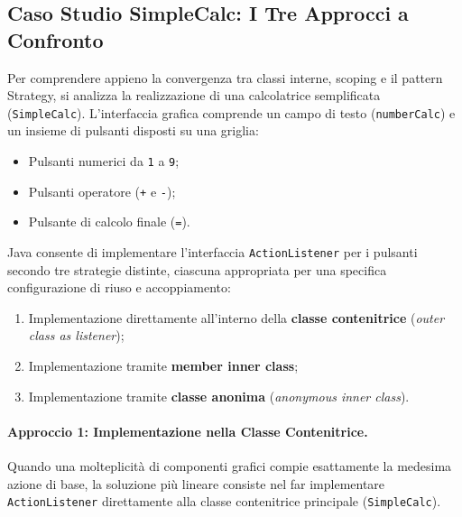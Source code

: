 \documentclass[12pt]{extarticle}
\begin{document}
\subsection{Caso Studio SimpleCalc: I Tre Approcci a Confronto}

\noindent Per comprendere appieno la convergenza tra classi interne, scoping e il pattern Strategy, si analizza la realizzazione di una calcolatrice semplificata (\texttt{SimpleCalc}). L'interfaccia grafica comprende un campo di testo (\texttt{numberCalc}) e un insieme di pulsanti disposti su una griglia:
\begin{itemize}
    \item Pulsanti numerici da \texttt{1} a \texttt{9};
    \item Pulsanti operatore (\texttt{+} e \texttt{-});
    \item Pulsante di calcolo finale (\texttt{=}).
\end{itemize}

\noindent Java consente di implementare l'interfaccia \texttt{ActionListener} per i pulsanti secondo tre strategie distinte, ciascuna appropriata per una specifica configurazione di riuso e accoppiamento:
\begin{enumerate}
    \item Implementazione direttamente all'interno della \textbf{classe contenitrice} (\textit{outer class as listener});
    \item Implementazione tramite \textbf{member inner class};
    \item Implementazione tramite \textbf{classe anonima} (\textit{anonymous inner class}).
\end{enumerate}

\paragraph{Approccio 1: Implementazione nella Classe Contenitrice.}
Quando una molteplicità di componenti grafici compie esattamente la medesima azione di base, la soluzione più lineare consiste nel far implementare \texttt{ActionListener} direttamente alla classe contenitrice principale (\texttt{SimpleCalc}).
\end{document}
